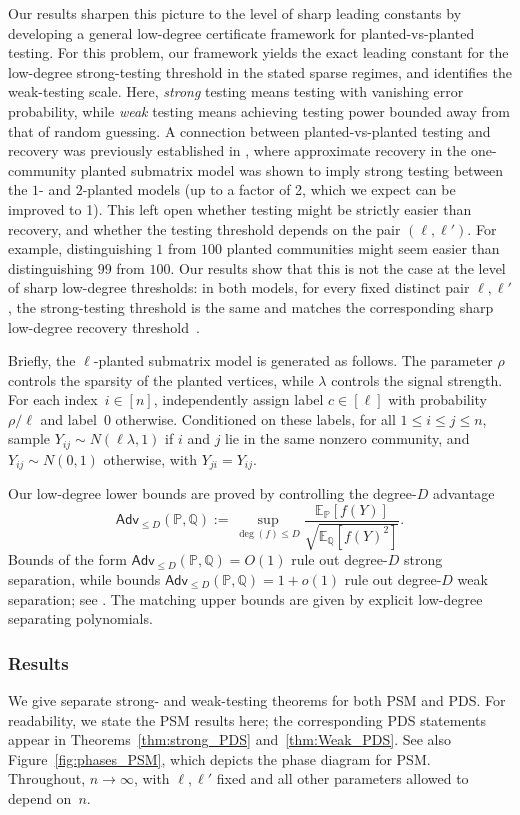 \documentclass[11pt, letterpaper]{article}
\numberwithin{equation}{section}
\newcommand{\Adv}{\mathsf{Adv}}
\newcommand{\E}{\mathbb{E}}
\newcommand{\PP}{\mathbb{P}}
\newcommand{\QQ}{\mathbb{Q}}
\begin{document}
Our results sharpen this picture to the level of sharp leading constants by developing a general low-degree certificate framework for planted-vs-planted testing. For this problem, our framework yields the exact leading constant for the low-degree strong-testing threshold in the stated sparse regimes, and identifies the weak-testing scale. Here, \emph{strong} testing means testing with vanishing error probability, while \emph{weak} testing means achieving testing power bounded away from that of random guessing. A connection between planted-vs-planted testing and recovery was previously established in \cite{rush2023easier}, where approximate recovery in the one-community planted submatrix model was shown to imply strong testing between the $1$- and $2$-planted models (up to a factor of 2, which we expect can be improved to 1). This left open whether testing might be strictly easier than recovery, and whether the testing threshold depends on the pair $(\ell,\ell')$. For example, distinguishing $1$ from $100$ planted communities might seem easier than distinguishing $99$ from $100$. Our results show that this is not the case at the level of sharp low-degree thresholds: in both models, for every fixed distinct pair $\ell,\ell'$, the strong-testing threshold is the same and matches the corresponding sharp low-degree recovery threshold~\cite{sohn2025sharp}.

\medskip
Briefly, the $\ell$-planted submatrix model is generated as follows. The parameter $\rho$ controls the sparsity of the planted vertices, while $\lambda$ controls the signal strength. For each index~$i\in[n]$, independently assign label $c\in[\ell]$ with probability $\rho/\ell$ and label~$0$ otherwise. Conditioned on these labels, for all $1\le i\le j\le n$, sample $Y_{ij}\sim N(\ell\lambda,1)$ if $i$ and $j$ lie in the same nonzero community, and $Y_{ij}\sim N(0,1)$ otherwise, with $Y_{ji}=Y_{ij}$.

Our low-degree lower bounds are proved by controlling the degree-$D$ advantage
\begin{equation}\label{eq.adv_def}\Adv_{\le D}(\PP,\QQ)
:=\sup_{\deg(f)\le D}
\frac{\E_{\PP}[f(Y)]}{\sqrt{\E_{\QQ}[f(Y)^2]}} .
\end{equation}
Bounds of the form $\Adv_{\le D}(\PP,\QQ)=O(1)$ rule out degree-$D$ strong separation, while bounds $\Adv_{\le D}(\PP,\QQ)=1+o(1)$ rule out degree-$D$ weak separation; see . The matching upper bounds are given by explicit low-degree separating polynomials.
\subsubsection{Results}We give separate strong- and weak-testing theorems for both PSM and PDS. For readability, we state the PSM results here; the corresponding PDS statements appear in Theorems~\ref{thm:strong_PDS} and~\ref{thm:Weak_PDS}. See also Figure~\ref{fig:phases_PSM}, which depicts the phase diagram for PSM. Throughout, $n\to\infty$, with $\ell,\ell'$ fixed and all other parameters allowed to depend on~$n$. 
\end{document}
